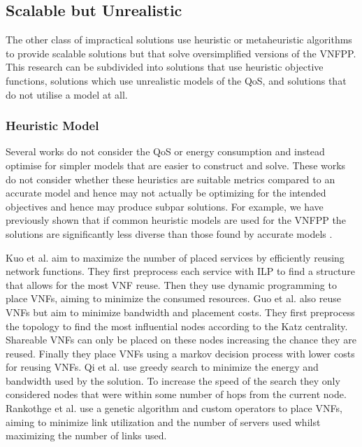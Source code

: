 \subsection{Scalable but Unrealistic}
The other class of impractical solutions use heuristic or metaheuristic algorithms to provide scalable solutions but that solve oversimplified versions of the VNFPP. This research can be subdivided into solutions that use heuristic objective functions, solutions which use unrealistic models of the QoS, and solutions that do not utilise a model at all. 

\subsubsection{Heuristic Model}
Several works do not consider the QoS or energy consumption and instead optimise for simpler models that are easier to construct and solve. These works do not consider whether these heuristics are suitable metrics compared to an accurate model and hence may not actually be optimizing for the intended objectives and hence may produce subpar solutions. For example, we have previously shown that if common heuristic models are used for the VNFPP the solutions are significantly less diverse than those found by accurate models \cite{BillingsleyLMMG22}.

Kuo et al. \cite{KuoLLT18} aim to maximize the number of placed services by efficiently reusing network functions. They first preprocess each service with ILP to find a structure that allows for the most VNF reuse. Then they use dynamic programming to place VNFs, aiming to minimize the consumed resources. Guo et al. \cite{GuoWLQA0Y20} also reuse VNFs but aim to minimize bandwidth and placement costs. They first preprocess the topology to find the most influential nodes according to the Katz centrality. Shareable VNFs can only be placed on these nodes increasing the chance they are reused. Finally they place VNFs using a markov decision process with lower costs for reusing VNFs. Qi et al. \cite{QiSW19} use greedy search to minimize the energy and bandwidth used by the solution. To increase the speed of the search they only considered nodes that were within some number of hops from the current node. Rankothge et al. \cite{RankothgeLRL17} use a genetic algorithm and custom operators to place VNFs, aiming to minimize link utilization and the number of servers used whilst maximizing the number of links used.

